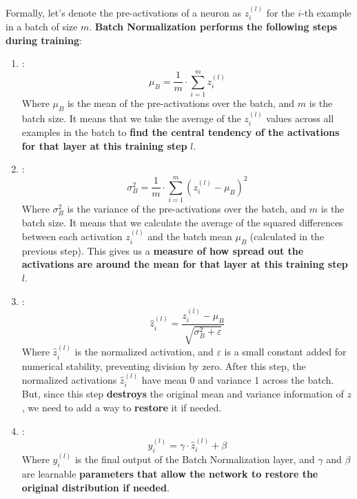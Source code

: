 \highspace
Formally, let's denote the pre-activations of a neuron as $z_i^{(l)}$ for the $i$-th example in a batch of size $m$. \textbf{Batch Normalization performs the following steps during training}:
\begin{enumerate}
    \item {}:
    \begin{equation}
        \mu_B = \dfrac{1}{m} \cdot \sum_{i=1}^{m} z_i^{(l)}
    \end{equation}
    Where $\mu_B$ is the mean of the pre-activations over the batch, and $m$ is the batch size. It means that we take the average of the $z_i^{(l)}$ values across all examples in the batch to \textbf{find the central tendency of the activations for that layer at this training step} $l$.

    \item {}:
    \begin{equation}
        \sigma_B^2 = \dfrac{1}{m} \cdot \sum_{i=1}^{m} \left(z_i^{(l)} - \mu_B\right)^2
    \end{equation}
    Where $\sigma_B^2$ is the variance of the pre-activations over the batch, and $m$ is the batch size. It means that we calculate the average of the squared differences between each activation $z_i^{(l)}$ and the batch mean $\mu_B$ (calculated in the previous step). This gives us a \textbf{measure of how spread out the activations are around the mean for that layer at this training step} $l$.

    \item {}:
    \begin{equation}
        \hat{z}_i^{(l)} = \dfrac{z_i^{(l)} - \mu_B}{\sqrt{\sigma_B^2 + \varepsilon}}
    \end{equation}
    Where $\hat{z}_i^{(l)}$ is the normalized activation, and $\varepsilon$ is a small constant added for numerical stability, preventing division by zero. After this step, the normalized activations $\hat{z}_i^{(l)}$ have mean 0 and variance 1 across the batch. But, since this step \textbf{destroys} the original mean and variance information of $z$, we need to add a way to \textbf{restore} it if needed.

    \item {}:
    \begin{equation}
        y_i^{(l)} = \gamma \cdot \hat{z}_i^{(l)} + \beta
    \end{equation}
    Where $y_i^{(l)}$ is the final output of the Batch Normalization layer, and $\gamma$ and $\beta$ are learnable \textbf{parameters that allow the network to restore the original distribution if needed}.


\end{enumerate}
